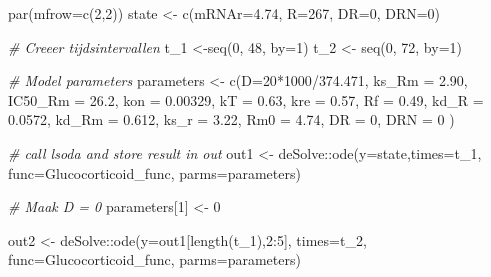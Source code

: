 \documentclass[
]{article}
\newenvironment{Shaded}{\begin{snugshade}}{\end{snugshade}}
\newcommand{\AttributeTok}[1]{\textcolor[rgb]{0.77,0.63,0.00}{#1}}
\newcommand{\CommentTok}[1]{\textcolor[rgb]{0.56,0.35,0.01}{\textit{#1}}}
\newcommand{\DecValTok}[1]{\textcolor[rgb]{0.00,0.00,0.81}{#1}}
\newcommand{\FloatTok}[1]{\textcolor[rgb]{0.00,0.00,0.81}{#1}}
\newcommand{\FunctionTok}[1]{\textcolor[rgb]{0.00,0.00,0.00}{#1}}
\newcommand{\NormalTok}[1]{#1}
\newcommand{\OtherTok}[1]{\textcolor[rgb]{0.56,0.35,0.01}{#1}}
\newcommand{\SpecialCharTok}[1]{\textcolor[rgb]{0.00,0.00,0.00}{#1}}
\begin{document}
\begin{Shaded}
\begin{Highlighting}[]
\FunctionTok{par}\NormalTok{(}\AttributeTok{mfrow=}\FunctionTok{c}\NormalTok{(}\DecValTok{2}\NormalTok{,}\DecValTok{2}\NormalTok{))}
\NormalTok{state }\OtherTok{\textless{}{-}} \FunctionTok{c}\NormalTok{(}\AttributeTok{mRNAr=}\FloatTok{4.74}\NormalTok{, }\AttributeTok{R=}\DecValTok{267}\NormalTok{, }\AttributeTok{DR=}\DecValTok{0}\NormalTok{, }\AttributeTok{DRN=}\DecValTok{0}\NormalTok{)}

\CommentTok{\# Creeer tijdsintervallen}
\NormalTok{t\_1 }\OtherTok{\textless{}{-}}\FunctionTok{seq}\NormalTok{(}\DecValTok{0}\NormalTok{, }\DecValTok{48}\NormalTok{, }\AttributeTok{by=}\DecValTok{1}\NormalTok{)}
\NormalTok{t\_2 }\OtherTok{\textless{}{-}} \FunctionTok{seq}\NormalTok{(}\DecValTok{0}\NormalTok{, }\DecValTok{72}\NormalTok{, }\AttributeTok{by=}\DecValTok{1}\NormalTok{)}

\CommentTok{\# Model parameters}
\NormalTok{parameters }\OtherTok{\textless{}{-}} \FunctionTok{c}\NormalTok{(}\AttributeTok{D=}\DecValTok{20}\SpecialCharTok{*}\DecValTok{1000}\SpecialCharTok{/}\FloatTok{374.471}\NormalTok{, }\AttributeTok{ks\_Rm =} \FloatTok{2.90}\NormalTok{, }\AttributeTok{IC50\_Rm =} \FloatTok{26.2}\NormalTok{, }\AttributeTok{kon =} \FloatTok{0.00329}\NormalTok{,}
                \AttributeTok{kT =} \FloatTok{0.63}\NormalTok{, }\AttributeTok{kre =} \FloatTok{0.57}\NormalTok{, }\AttributeTok{Rf =} \FloatTok{0.49}\NormalTok{, }\AttributeTok{kd\_R =} \FloatTok{0.0572}\NormalTok{,}
                \AttributeTok{kd\_Rm =} \FloatTok{0.612}\NormalTok{, }\AttributeTok{ks\_r =} \FloatTok{3.22}\NormalTok{, }\AttributeTok{Rm0 =} \FloatTok{4.74}\NormalTok{,}
                \AttributeTok{DR =} \DecValTok{0}\NormalTok{, }\AttributeTok{DRN =} \DecValTok{0}
\NormalTok{)}

\CommentTok{\# call lsoda and store result in out}
\NormalTok{out1 }\OtherTok{\textless{}{-}}\NormalTok{ deSolve}\SpecialCharTok{::}\FunctionTok{ode}\NormalTok{(}\AttributeTok{y=}\NormalTok{state,}\AttributeTok{times=}\NormalTok{t\_1, }\AttributeTok{func=}\NormalTok{Glucocorticoid\_func, }\AttributeTok{parms=}\NormalTok{parameters)}

\CommentTok{\# Maak D = 0}
\NormalTok{parameters[}\DecValTok{1}\NormalTok{] }\OtherTok{\textless{}{-}} \DecValTok{0}

\NormalTok{out2 }\OtherTok{\textless{}{-}}\NormalTok{ deSolve}\SpecialCharTok{::}\FunctionTok{ode}\NormalTok{(}\AttributeTok{y=}\NormalTok{out1[}\FunctionTok{length}\NormalTok{(t\_1),}\DecValTok{2}\SpecialCharTok{:}\DecValTok{5}\NormalTok{], }\AttributeTok{times=}\NormalTok{t\_2, }\AttributeTok{func=}\NormalTok{Glucocorticoid\_func, }\AttributeTok{parms=}\NormalTok{parameters) }


\end{Highlighting}
\end{Shaded}
\end{document}

